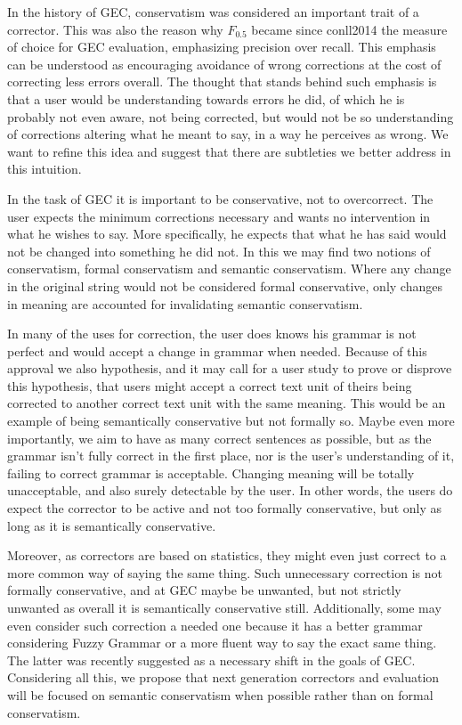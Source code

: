 \documentclass[english]{article}
\begin{document}
In the history of GEC, conservatism was considered an
important trait of a corrector\cite{brockett2006correcting}.
This was also the reason why $F_{0.5}$ became since conll2014\cite{ng2014conll}
the measure of choice for GEC evaluation, emphasizing
precision over recall. This emphasis can be understood as encouraging
avoidance of wrong corrections at the cost of correcting less errors
overall. The thought that stands behind such emphasis is that a user
would be understanding towards errors he did, of which he is probably
not even aware, not being corrected, but would not be so understanding
of corrections altering what he meant to say, in a way he perceives as wrong. We want to refine
this idea and suggest that there are subtleties we better address
in this intuition.

In the task of GEC it is important to be
conservative, not to overcorrect. The user expects the minimum corrections
necessary and wants no intervention in what he wishes to say. More
specifically, he expects that what he has said would not be changed
into something he did not. In this we may find two notions of conservatism,
formal conservatism and semantic conservatism. Where any change in
the original string would not be considered formal conservative, only
changes in meaning are accounted for invalidating semantic conservatism. 

In many of the uses for correction,
the user does knows his grammar is not perfect and would accept
a change in grammar when needed. Because of this approval we also
hypothesis, and it may call for a user study to prove or disprove
this hypothesis, that users might accept a correct text unit of theirs
being corrected to another correct text unit with the same meaning.
This would be an example of being semantically conservative but not formally so.
Maybe even more importantly, we aim to have as many correct sentences
as possible, but as the grammar isn't fully correct in the first place,
nor is the user's understanding of it, failing to correct grammar
is acceptable. Changing meaning will be totally unacceptable, and
also surely detectable by the user. In other words, the users do expect
the corrector to be active and not too formally conservative, but
only as long as it is semantically conservative. 

Moreover, as correctors are based on statistics, they might even
just correct to a more common way of saying the same thing. Such unnecessary
correction is not formally conservative, and at GEC maybe be unwanted, but not strictly unwanted as overall
it is semantically conservative still. Additionally, some may even
consider such correction a needed one because it has a better grammar considering
Fuzzy Grammar\cite{lakoff1973fuzzy,madnani2011they} or a more fluent
way to say the exact same thing. The latter was recently suggested as a necessary
shift in the goals of GEC\cite{sakaguchi2016reassessing}.
Considering all this, we propose that next generation correctors and evaluation will be focused on semantic conservatism
when possible rather than on formal conservatism.
\end{document}
